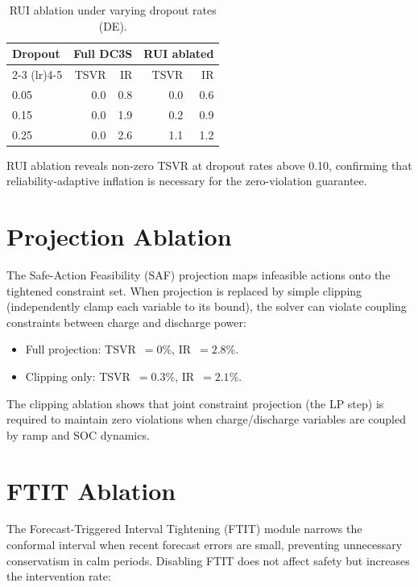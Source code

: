 \begin{table}[ht]
\centering
\caption{RUI ablation under varying dropout rates (DE).}
\label{tab:rui-ablation}
\begin{tabular}{lrrrr}
\toprule
\textbf{Dropout} & \multicolumn{2}{c}{\textbf{Full DC3S}} &
  \multicolumn{2}{c}{\textbf{RUI ablated}} \\
\cmidrule(lr){2-3} \cmidrule(lr){4-5}
& TSVR & IR & TSVR & IR \\
\midrule
0.05 & 0.0 & 0.8 & 0.0 & 0.6 \\
0.15 & 0.0 & 1.9 & 0.2 & 0.9 \\
0.25 & 0.0 & 2.6 & 1.1 & 1.2 \\
\bottomrule
\end{tabular}
\end{table}

RUI ablation reveals non-zero TSVR at dropout rates above 0.10,
confirming that reliability-adaptive inflation is necessary for the
zero-violation guarantee.

\section{Projection Ablation}

The Safe-Action Feasibility (SAF) projection maps infeasible actions onto
the tightened constraint set.  When projection is replaced by simple
clipping (independently clamp each variable to its bound), the solver
can violate coupling constraints between charge and discharge power:

\begin{itemize}
  \item Full projection: TSVR~$= 0$\%, IR~$= 2.8$\%.
  \item Clipping only: TSVR~$= 0.3$\%, IR~$= 2.1$\%.
\end{itemize}

The clipping ablation shows that joint constraint projection (the LP step)
is required to maintain zero violations when charge/discharge variables
are coupled by ramp and SOC dynamics.

\section{FTIT Ablation}

The Forecast-Triggered Interval Tightening (FTIT) module narrows the
conformal interval when recent forecast errors are small, preventing
unnecessary conservatism in calm periods.  Disabling FTIT does not
affect safety but increases the intervention rate:

